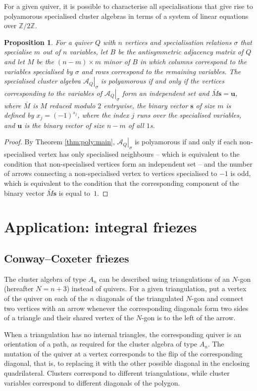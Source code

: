 \documentclass[12pt]{article}
\newtheorem{proposition}{Proposition}
\theoremstyle{definition}
\newcommand{\Z}{\mathbb{Z}}
\newcommand{\sA}{\left.\mathcal{A}_Q\right|_\sigma}
\begin{document}
For a given quiver, it is possible to characterise all specialisations that give rise to polyamorous specialised cluster algebras in terms of a system of linear equations over $\Z/2\Z$.
\begin{proposition}
For a quiver $Q$ with $n$ vertices and specialisation relations $\sigma$ that specialise $m$ out of $n$ variables, let $B$ be the antisymmetric adjacency matrix of $Q$ and let $M$ be the $(n-m)\times m$ minor of $B$ in which columns correspond to the variables specialised by $\sigma$ and rows correspond to the remaining variables. The specialised cluster algebra $\sA$ is polyamorous if and only if the vertices corresponding to the variables of $\sA$ form an independent set and $\bar{M}\mathbf{s}=\mathbf{u}$, where $\bar{M}$ is $M$ reduced modulo $2$ entrywise, the binary vector $\mathbf{s}$ of size $m$ is defined by $x_j=(-1)^{s_j}$, where the index $j$ runs over the specialised variables, and $\mathbf{u}$ is the binary vector of size $n-m$ of all $1$s.
\end{proposition}
\begin{proof}
By Theorem \ref{thm:poly:main}, $\sA$ is polyamorous if and only if each non-specialised vertex has only specialised neighbours -- which is equivalent to the condition that non-specialised vertices form an independent set -- and the number of arrows connecting a non-specialised vertex to vertices specialised to $-1$ is odd, which is equivalent to the condition that the corresponding component of the binary vector $\bar{M}\mathbf{s}$ is equal to~$1$.
\end{proof}


\section{Application: integral friezes}
\label{sec:app}

\subsection{Conway--Coxeter friezes}
The cluster algebra of type $A_n$ can be described using triangulations of an $N$-gon (hereafter $N=n+3$) instead of quivers. For a given triangulation, put a vertex of the quiver on each of the $n$ diagonals of the triangulated $N$-gon and connect two vertices with an arrow whenever the corresponding diagonals form two sides of a triangle and their shared vertex of the $N$-gon is to the left of the arrow.

When a triangulation has no internal triangles, the corresponding quiver is an orientation of a path, as required for the cluster algebra of type $A_n$. The mutation of the quiver at a vertex corresponds to the flip of the corresponding diagonal, that is, to replacing it with the other possible diagonal in the enclosing quadrilateral. Clusters correspond to different triangulations, while cluster variables correspond to different diagonals of the polygon.
\end{document}
